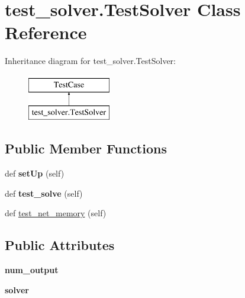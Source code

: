 \hypertarget{classtest__solver_1_1_test_solver}{}\section{test\+\_\+solver.\+Test\+Solver Class Reference}
\label{classtest__solver_1_1_test_solver}
Inheritance diagram for test\+\_\+solver.\+Test\+Solver\+:\begin{figure}[H]
\begin{center}
\leavevmode
\includegraphics[height=2.000000cm]{classtest__solver_1_1_test_solver}
\end{center}
\end{figure}
\subsection*{Public Member Functions}
\begin{DoxyCompactItemize}
\item 
\hypertarget{classtest__solver_1_1_test_solver_ae66a20cbe4bee7698988c942f952d4a4}{}def {\bfseries set\+Up} (self)\label{classtest__solver_1_1_test_solver_ae66a20cbe4bee7698988c942f952d4a4}

\item 
\hypertarget{classtest__solver_1_1_test_solver_afee26d7e2697201c53619d45155cd201}{}def {\bfseries test\+\_\+solve} (self)\label{classtest__solver_1_1_test_solver_afee26d7e2697201c53619d45155cd201}

\item 
def \hyperlink{classtest__solver_1_1_test_solver_a96cd6dd0b2efecf67ee792f6f996a025}{test\+\_\+net\+\_\+memory} (self)
\end{DoxyCompactItemize}
\subsection*{Public Attributes}
\begin{DoxyCompactItemize}
\item 
\hypertarget{classtest__solver_1_1_test_solver_ae9727355daa663ba0a24cb7a28760b76}{}{\bfseries num\+\_\+output}\label{classtest__solver_1_1_test_solver_ae9727355daa663ba0a24cb7a28760b76}

\item 
\hypertarget{classtest__solver_1_1_test_solver_a85495400c6668028c584367ded1521e5}{}{\bfseries solver}\label{classtest__solver_1_1_test_solver_a85495400c6668028c584367ded1521e5}

\end{DoxyCompactItemize}


